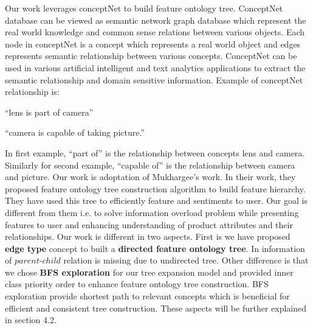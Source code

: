Our work leverages conceptNet\cite{liu2004conceptnet} to build feature ontology tree. ConceptNet database can be viewed as semantic network graph database which represent the real world knowledge and common sense relations between various objects. Each node in conceptNet is a concept which represents a real world object and edges represents semantic relationship between various concepts. ConceptNet can be used in various artificial intelligent and text analytics applications to extract the semantic relationship and domain sensitive information. Example of conceptNet relationship is: 

``lens is part of camera''

``camera is capable of taking picture.''

In first example, ``part of'' is the relationship between concepts lens and camera. Similarly for second example, ``capable of'' is the relationship between camera and picture. Our work is adoptation of Mukhargee's work\cite{mukherjee2013sentiment}. In their work, they proposed feature ontology tree construction algorithm to build feature hierarchy. They have used this tree to efficiently feature and sentiments to user. Our goal is different from them i.e. to solve information overload problem while presenting features to user and enhancing understanding of product attributes and their relationships. Our work is different in two aspects. First is we have proposed \textbf{edge type} concept to built a \textbf{directed feature ontology tree}. In \cite{mukherjee2013sentiment} information of $parent$-$child$ relation is missing due to undirected tree. Other difference is that we chose \textbf{BFS exploration} for our tree expansion model and provided inner class priority order to enhance feature ontology tree construction. BFS exploration provide shortest path to relevant concepts which is beneficial for efficient and consistent tree construction. These aspects will be further explained in section 4.2.   
